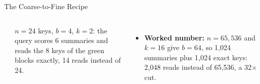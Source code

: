 \begin{frame}{The Coarse-to-Fine Recipe}
\begin{columns}[T,onlytextwidth]
\\[0.4em]
      {\scriptsize $n = 24$ keys, $b = 4$, $k = 2$: the query scores 6 summaries and reads the 8 keys of the green blocks exactly, 14 reads instead of 24.\par}
      \vspace{0.6em}
      \begin{itemize}\footnotesize
        \item[\textcolor{red}{$\blacktriangleright$}] \textbf{Worked number:} $n = 65{,}536$ and $k = 16$ give $b = 64$, so 1,024 summaries plus 1,024 exact keys: 2,048 reads instead of 65,536, a 32$\times$ cut.
      \end{itemize}
  \end{columns}
\end{frame}


